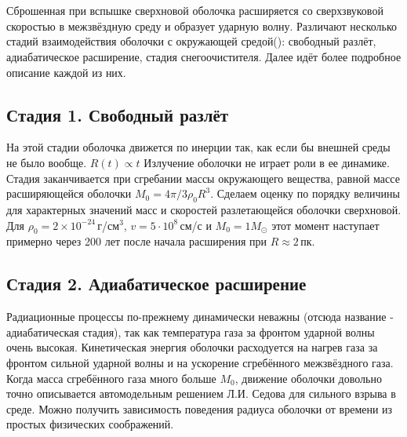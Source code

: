 \documentclass[a4paper,12pt]{extarticle}
\begin{document}
\subsection{}



\section{}


Сброшенная при вспышке сверхновой оболочка расширяется со сверхзвуковой скоростью в межзвёздную среду и образует ударную волну. 
Различают несколько стадий взаимодействия оболочки с окружающей средой({\cite{Spitzer1981}}): свободный разлёт, адиабатическое расширение, стадия снегоочистителя. Далее идёт более подробное описание каждой из них.

\subsection{}



\subsection{Стадия 1. Свободный разлёт} \label{sec:free_exp}
На этой стадии оболочка движется по инерции так, как если бы внешней среды не было вообще. $R(t)\propto t $ 
Излучение оболочки не играет роли в ее динамике. Стадия заканчивается при сгребании массы окружающего вещества, равной массе расширяющейся оболочки $M_0 = 4\pi/3\rho_0R^3$. 
Сделаем оценку по порядку величины для характерных значений масс и скоростей разлетающейся оболочки сверхновой.
Для $\rho_0=2\times10^{-24}$\,г/см$^3$, $v=5\cdot10^8$\,см/с и $M_0=1M_{\odot}$ этот момент наступает примерно через 200 лет после начала расширения при $R\approx 2$\,пк.

\subsection{Стадия 2. Адиабатическое расширение} 
Радиационные процессы по-прежнему динамически неважны (отсюда название - адиабатическая стадия), так как температура газа за фронтом ударной волны очень высокая. Кинетическая энергия оболочки расходуется на нагрев газа за фронтом сильной ударной волны и на ускорение сгребённого межзвёздного газа. Когда масса сгребённого газа много больше $M_0$, движение оболочки довольно точно описывается автомодельным решением Л.И. Седова для сильного взрыва в среде. Можно получить зависимость поведения радиуса оболочки от времени из простых физических соображений.
\end{document}
